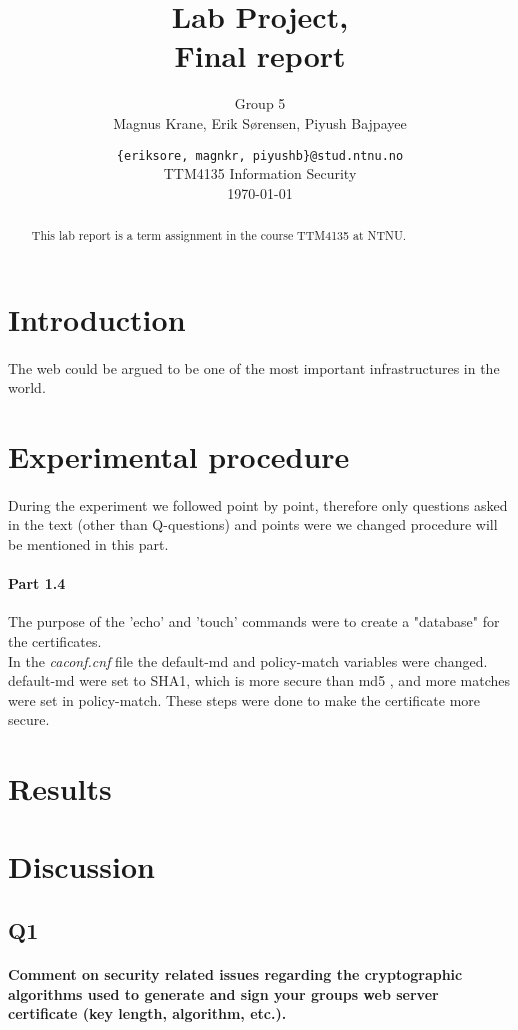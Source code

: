 \documentclass[a4paper,11pt]{article}
\title{Lab Project,\\Final report}
\author{Group 5 \\Magnus Krane, Erik S\o rensen, Piyush Bajpayee}
\date{ {\tt \{eriksore, magnkr, piyushb\}@stud.ntnu.no}\\
TTM4135 Information Security\\
\today}
\begin{document}
\maketitle
\vspace{3cm}
\begin{abstract}
This lab report is a term assignment in the course TTM4135 at NTNU. 
\end{abstract}
\section{Introduction}
\paragraph{}The web could be argued to be one of the most important infrastructures in the world.
\section{Experimental procedure}
\paragraph{}During the experiment we followed \cite{1} point by point, therefore only questions asked in the text (other than Q-questions) and points were we changed procedure will be mentioned in this part.
\paragraph{Part 1.4}The purpose of the 'echo' and 'touch' commands were to create a "database" for the certificates.\\
In the \emph{caconf.cnf} file the default-md and policy-match variables were changed. default-md were set to SHA1, which is more secure than md5 \cite{3}, and more matches were set in policy-match. These steps were done to make the certificate more secure.
\section{Results}
\section{Discussion}
\subsection{Q1}
\paragraph{Comment on security related issues regarding the cryptographic algorithms used to
generate and sign your groups web server certiﬁcate (key length, algorithm, etc.).}
\end{document}
